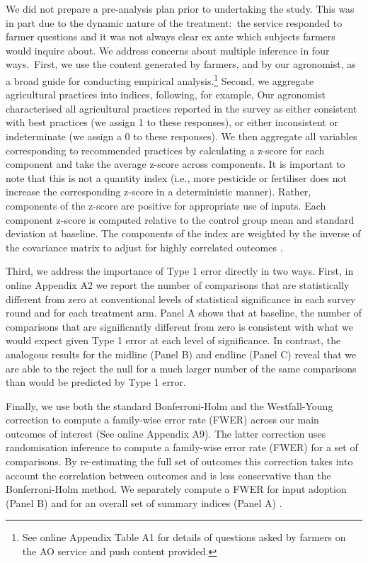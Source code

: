 \documentclass[12pt]{article}
\begin{document}
{{\normalsize We did not prepare a pre-analysis plan prior to undertaking the
study. This was in part due to the dynamic nature of the treatment:\ the
service responded to farmer questions and it was not always clear ex ante
which subjects farmers would inquire about. We address concerns about
multiple inference in four ways.\ First, we use the content generated by
farmers, and by our agronomist, as a broad guide for conducting empirical
analysis.\footnote{%
See online Appendix Table A1 for details of questions asked by farmers on the AO
service and push content provided.} Second, we aggregate agricultural practices into indices, following, for example, \citet{kling2007experimental}
Our agronomist characterised all agricultural practices reported in the survey as either consistent with best practices (we assign 1 to these responses), or either inconsistent or indeterminate (we assign a 0 to these responses). We then aggregate all variables corresponding to recommended practices by calculating a z-score for each component and take the average z-score across components. It is important to note that this is not a quantity index (i.e., more pesticide or fertiliser does not  increase the corresponding z-score in a deterministic manner). Rather, components of the z-score are positive for appropriate use of inputs. Each component z-score is computed relative to the control group mean and standard deviation at baseline. The components of the index are weighted by the inverse of the covariance matrix to adjust for highly correlated outcomes \citep{anderson2008multiple}. }

{\normalsize Third, we address the importance of Type 1 error directly in
two ways. First, in online Appendix A2 we report the number of comparisons that are
statistically different from zero at conventional levels of statistical
significance in each survey round and for each treatment arm. Panel A shows
that at baseline, the number of comparisons that are significantly different
from zero is consistent with what we would expect given Type 1 error at each
level of significance. In contrast, the analogous results for the midline
(Panel B) and endline (Panel C) reveal that we are able to the reject the
null for a much larger number of the same comparisons than would be
predicted by Type 1 error.}
 
{\normalsize Finally, we use both the standard Bonferroni-Holm and the Westfall-Young correction to compute a
family-wise error rate (FWER) across our main outcomes of interest (See
online Appendix A9). The latter correction uses randomisation inference to compute a family-wise error rate (FWER) for a set of comparisons. By re-estimating the full set of outcomes this correction takes into account the correlation between outcomes and is less conservative than the Bonferroni-Holm method. We separately compute a FWER for input adoption (Panel B) and for an overall set of summary indices (Panel A) \citep{anderson2008multiple}}.}
\end{document}
